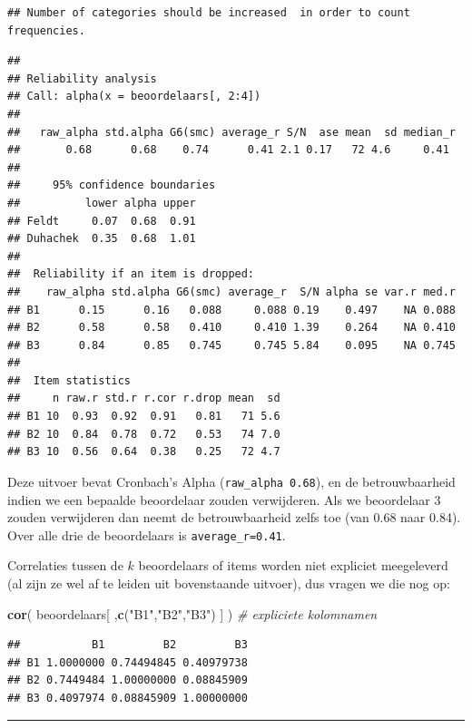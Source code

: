 \documentclass[
]{book}
\newenvironment{Shaded}{\begin{snugshade}}{\end{snugshade}}
\newcommand{\CommentTok}[1]{\textcolor[rgb]{0.56,0.35,0.01}{\textit{#1}}}
\newcommand{\FunctionTok}[1]{\textcolor[rgb]{0.13,0.29,0.53}{\textbf{#1}}}
\newcommand{\NormalTok}[1]{#1}
\newcommand{\StringTok}[1]{\textcolor[rgb]{0.31,0.60,0.02}{#1}}
\begin{document}
\begin{verbatim}
## Number of categories should be increased  in order to count frequencies.
\end{verbatim}

\begin{verbatim}
## 
## Reliability analysis   
## Call: alpha(x = beoordelaars[, 2:4])
## 
##   raw_alpha std.alpha G6(smc) average_r S/N  ase mean  sd median_r
##       0.68      0.68    0.74      0.41 2.1 0.17   72 4.6     0.41
## 
##     95% confidence boundaries 
##          lower alpha upper
## Feldt     0.07  0.68  0.91
## Duhachek  0.35  0.68  1.01
## 
##  Reliability if an item is dropped:
##    raw_alpha std.alpha G6(smc) average_r  S/N alpha se var.r med.r
## B1      0.15      0.16   0.088     0.088 0.19    0.497    NA 0.088
## B2      0.58      0.58   0.410     0.410 1.39    0.264    NA 0.410
## B3      0.84      0.85   0.745     0.745 5.84    0.095    NA 0.745
## 
##  Item statistics 
##     n raw.r std.r r.cor r.drop mean  sd
## B1 10  0.93  0.92  0.91   0.81   71 5.6
## B2 10  0.84  0.78  0.72   0.53   74 7.0
## B3 10  0.56  0.64  0.38   0.25   72 4.7
\end{verbatim}

Deze uitvoer bevat Cronbach's Alpha (\texttt{raw\_alpha\ 0.68}), en de
betrouwbaarheid indien we een bepaalde beoordelaar zouden verwijderen.
Als we beoordelaar 3 zouden verwijderen dan neemt de betrouwbaarheid
zelfs toe (van 0.68 naar 0.84). Over alle drie de beoordelaars is
\texttt{average\_r=0.41}.

Correlaties tussen de \(k\) beoordelaars of items worden niet expliciet
meegeleverd (al zijn ze wel af te leiden uit bovenstaande uitvoer), dus
vragen we die nog op:

\begin{Shaded}
\begin{Highlighting}[]
\FunctionTok{cor}\NormalTok{( beoordelaars[ ,}\FunctionTok{c}\NormalTok{(}\StringTok{"B1"}\NormalTok{,}\StringTok{"B2"}\NormalTok{,}\StringTok{"B3"}\NormalTok{) ] ) }\CommentTok{\# expliciete kolomnamen}
\end{Highlighting}
\end{Shaded}

\begin{verbatim}
##           B1         B2         B3
## B1 1.0000000 0.74494845 0.40979738
## B2 0.7449484 1.00000000 0.08845909
## B3 0.4097974 0.08845909 1.00000000
\end{verbatim}

\begin{center}\rule{0.5\linewidth}{0.5pt}\end{center}
\end{document}
